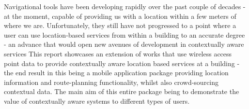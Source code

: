 Navigational tools have been developing rapidly over the past couple of decades - at the moment, capable of providing us with a location within a few meters of where we are. Unfortunately, they still have not progressed to a point where a user can use location-based services from within a building to an accurate degree - an advance that would open new avenues of development in contextually aware services
\newline
\newline
This report showcases an extension of works that use wireless access point data to provide contextually aware location based services at a building - the end result in this being a mobile application package providing location information and route-planning functionality, whilst also crowd-sourcing contextual data. The main aim of this entire package being to demonstrate the value of contextually aware systems to different types of users.